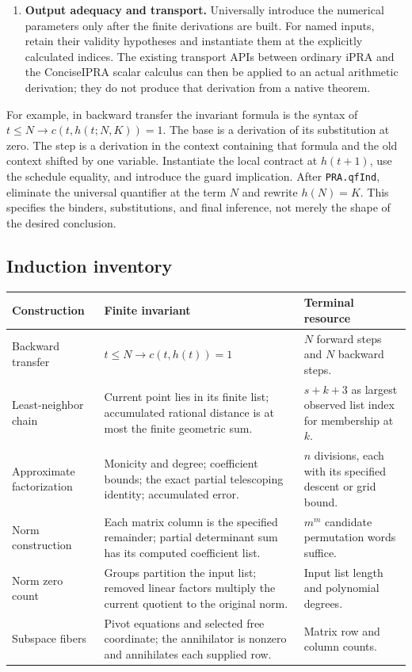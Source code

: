 \begin{enumerate}
Vandermonde calculation, and synthetic removal of linear factors.
For the specialized theorem, formalize the unique-weight argument and
the unique cyclic-shift determinant term. The finite proof has no
irreducibility or divisor-theory dependency to import.
\item \textbf{Output adequacy and transport.} Universally introduce
the numerical parameters only after the finite derivations are built.
For named inputs, retain their validity hypotheses and instantiate them
at the explicitly calculated indices. The existing transport APIs between ordinary iPRA and
the ConciseIPRA scalar calculus can then be applied to an actual arithmetic
derivation; they do not produce that derivation from a native theorem.
\end{enumerate}

For example, in backward transfer the invariant formula is the syntax
of $t\le N\to c(t,h(t;N,K))=1$. The base is a derivation of its
substitution at zero. The step is a derivation in the context containing
that formula and the old context shifted by one variable. Instantiate
the local contract at $h(t+1)$, use the schedule equality, and introduce
the guard implication. After \texttt{PRA.qfInd}, eliminate the universal
quantifier at the term $N$ and rewrite $h(N)=K$. This specifies the
binders, substitutions, and final inference, not merely the shape of
the desired conclusion.

\clearpage
\subsection{Induction inventory}

\begin{longtable}{@{}p{}p{}p{}@{}}
\toprule
Construction & Finite invariant & Terminal resource\\
\midrule
\endhead
Backward transfer & $t\le N\to c(t,h(t))=1$ & $N$ forward steps and
$N$ backward steps.\\[3pt]
Least-neighbor chain & Current point lies in its finite list; accumulated
rational distance is at most the finite geometric sum. & $s+k+3$ as
largest observed list index for membership at $k$.\\[3pt]
Approximate factorization & Monicity and degree; coefficient bounds;
the exact partial telescoping identity; accumulated error. & $n$
divisions, each with its specified descent or grid bound.\\[3pt]
Norm construction & Each matrix column is the specified remainder;
partial determinant sum has its computed coefficient list. & $m^m$
candidate permutation words suffice.\\[3pt]
Norm zero count & Groups partition the input list; removed linear
factors multiply the current quotient to the original norm. & Input
list length and polynomial degrees.\\[3pt]
Subspace fibers & Pivot equations and selected free coordinate;
the annihilator is nonzero and annihilates each supplied row. & Matrix
row and column counts.\\
\bottomrule
\end{longtable}

